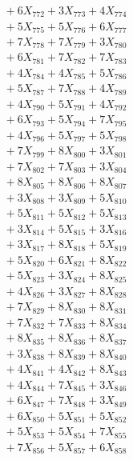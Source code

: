 \documentclass[a4paper,10pt]{article}
\begin{document}
{\begin{align}
&\;  + 6 X_{772} + 3 X_{773} + 4 X_{774} \\[0.3ex]
&\;  + 5 X_{775} + 5 X_{776} + 6 X_{777} \\[0.3ex]
&\;  + 7 X_{778} + 7 X_{779} + 3 X_{780} \\[0.3ex]
&\;  + 6 X_{781} + 7 X_{782} + 7 X_{783} \\[0.3ex]
&\;  + 4 X_{784} + 4 X_{785} + 5 X_{786} \\[0.3ex]
&\;  + 5 X_{787} + 7 X_{788} + 4 X_{789} \\[0.5ex]\allowbreak
&\;  + 4 X_{790} + 5 X_{791} + 4 X_{792} \\[0.3ex]
&\;  + 6 X_{793} + 5 X_{794} + 7 X_{795} \\[0.3ex]
&\;  + 4 X_{796} + 5 X_{797} + 5 X_{798} \\[0.3ex]
&\;  + 7 X_{799} + 8 X_{800} + 3 X_{801} \\[0.3ex]
&\;  + 7 X_{802} + 7 X_{803} + 3 X_{804} \\[0.3ex]
&\;  + 8 X_{805} + 8 X_{806} + 8 X_{807} \\[0.3ex]
&\;  + 3 X_{808} + 3 X_{809} + 5 X_{810} \\[0.3ex]
&\;  + 5 X_{811} + 5 X_{812} + 5 X_{813} \\[0.3ex]
&\;  + 3 X_{814} + 5 X_{815} + 3 X_{816} \\[0.3ex]
&\;  + 3 X_{817} + 8 X_{818} + 5 X_{819} \\[0.5ex]\allowbreak
&\;  + 5 X_{820} + 6 X_{821} + 8 X_{822} \\[0.3ex]
&\;  + 5 X_{823} + 3 X_{824} + 8 X_{825} \\[0.3ex]
&\;  + 4 X_{826} + 3 X_{827} + 8 X_{828} \\[0.3ex]
&\;  + 7 X_{829} + 8 X_{830} + 8 X_{831} \\[0.3ex]
&\;  + 7 X_{832} + 7 X_{833} + 8 X_{834} \\[0.3ex]
&\;  + 8 X_{835} + 8 X_{836} + 8 X_{837} \\[0.3ex]
&\;  + 3 X_{838} + 8 X_{839} + 8 X_{840} \\[0.3ex]
&\;  + 4 X_{841} + 4 X_{842} + 8 X_{843} \\[0.3ex]
&\;  + 4 X_{844} + 7 X_{845} + 3 X_{846} \\[0.3ex]
&\;  + 6 X_{847} + 7 X_{848} + 3 X_{849} \\[0.5ex]\allowbreak
&\;  + 6 X_{850} + 5 X_{851} + 5 X_{852} \\[0.3ex]
&\;  + 5 X_{853} + 5 X_{854} + 7 X_{855} \\[0.3ex]
&\;  + 7 X_{856} + 5 X_{857} + 6 X_{858} \\[0.3ex]

\end{align}}
\end{document}
